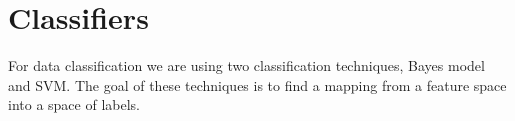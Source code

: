 \chapter{Classifiers}
For data classification we are using two classification techniques, Bayes model and SVM. The goal of these techniques is to find a mapping from a feature space into a space of labels.




